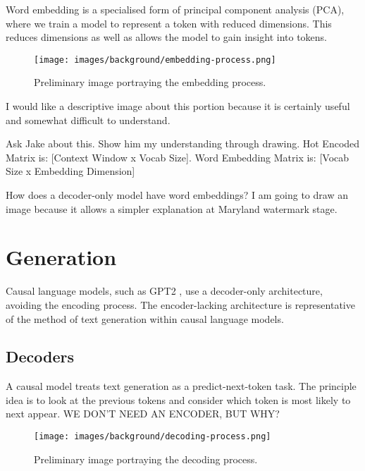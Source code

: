 \documentclass{l4proj}
\theoremstyle{definition}
\begin{document}
        Word embedding is a specialised form of principal component analysis (PCA), where we train a model to represent a token with reduced dimensions. This reduces dimensions as well as allows the model to gain insight into tokens.

        \begin{figure}[h]
            \centering
            \texttt{[image: images/background/embedding-process.png]}
                \caption{Preliminary image portraying the embedding process.}
            \label{fig:embedding-process} 
        \end{figure}

        I would like a descriptive image about this portion because it is certainly useful and somewhat difficult to understand. 
        
        Ask Jake about this. Show him my understanding through drawing.
        Hot Encoded Matrix is: [Context Window x Vocab Size]. Word Embedding Matrix is: [Vocab Size x Embedding Dimension]
        
        How does a decoder-only model have word embeddings?
        I am going to draw an image because it allows a simpler explanation at Maryland watermark stage.
        
\section{Generation}
    Causal language models, such as GPT2 \citep{gpt2Radford2019LanguageMAgpt}, use a decoder-only architecture, avoiding the encoding process. The encoder-lacking architecture is representative of the method of text generation within causal language models. 
    
    \subsection{Decoders}
        A causal model treats text generation as a predict-next-token task. The principle idea is to look at the previous tokens and consider which token is most likely to next appear. WE DON'T NEED AN ENCODER, BUT WHY?
    
        \begin{figure}[h]
            \centering
            \texttt{[image: images/background/decoding-process.png]}
                \caption{Preliminary image portraying the decoding process.}
            \label{fig:embedding-process} 
        \end{figure}
    
\end{document}
